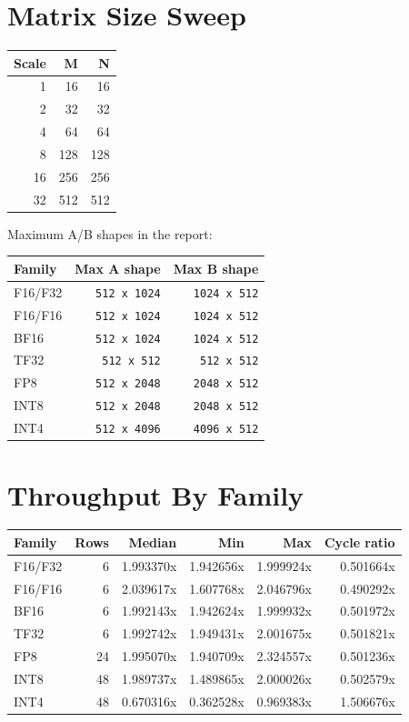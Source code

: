 \documentclass[10pt]{article}
\begin{document}
\section{Matrix Size Sweep}

\begin{center}
\small
\begin{tabular}{rrr}
\toprule
Scale & M & N \\
\midrule
1 & 16 & 16 \\
2 & 32 & 32 \\
4 & 64 & 64 \\
8 & 128 & 128 \\
16 & 256 & 256 \\
32 & 512 & 512 \\
\bottomrule
\end{tabular}
\end{center}

Maximum A/B shapes in the report:

\begin{center}
\small
\begin{tabular}{lrr}
\toprule
Family & Max A shape & Max B shape \\
\midrule
F16/F32 & \texttt{512 x 1024} & \texttt{1024 x 512} \\
F16/F16 & \texttt{512 x 1024} & \texttt{1024 x 512} \\
BF16 & \texttt{512 x 1024} & \texttt{1024 x 512} \\
TF32 & \texttt{512 x 512} & \texttt{512 x 512} \\
FP8 & \texttt{512 x 2048} & \texttt{2048 x 512} \\
INT8 & \texttt{512 x 2048} & \texttt{2048 x 512} \\
INT4 & \texttt{512 x 4096} & \texttt{4096 x 512} \\
\bottomrule
\end{tabular}
\end{center}

\section{Throughput By Family}

\begin{center}
\small
\begin{tabular}{lrrrrr}
\toprule
Family & Rows & Median & Min & Max & Cycle ratio \\
\midrule
F16/F32 & 6 & 1.993370x & 1.942656x & 1.999924x & 0.501664x \\
F16/F16 & 6 & 2.039617x & 1.607768x & 2.046796x & 0.490292x \\
BF16 & 6 & 1.992143x & 1.942624x & 1.999932x & 0.501972x \\
TF32 & 6 & 1.992742x & 1.949431x & 2.001675x & 0.501821x \\
FP8 & 24 & 1.995070x & 1.940709x & 2.324557x & 0.501236x \\
INT8 & 48 & 1.989737x & 1.489865x & 2.000026x & 0.502579x \\
INT4 & 48 & 0.670316x & 0.362528x & 0.969383x & 1.506676x \\
\bottomrule
\end{tabular}
\end{center}
\end{document}
